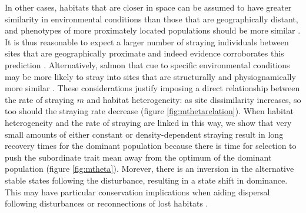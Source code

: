 \documentclass{revtex4}
\begin{document}
In other cases, habitats that are closer in space can be assumed to have greater similarity in environmental conditions than those that are geographically distant, and phenotypes of more proximately located populations should be more similar \citep{Reisenbichler:1988ex,Fraser:2011co,Westley:2012ui}.
It is thus reasonable to expect a larger number of straying individuals between sites that are geographically proximate and indeed evidence corroborates this prediction \citep{Candy:2000hu,JPE:JPE1383}.
Alternatively, salmon that cue to specific environmental conditions may be more likely to stray into sites that are structurally and physiognamically more similar \citep{Peterson:2014gy}.
These considerations justify imposing a direct relationship between the rate of straying $m$ and habitat heterogeneity: as site dissimilarity increases, so too should the straying rate decrease (figure \ref{fig:mthetarelation}).
When habitat heterogeneity and the rate of straying are linked in this way, we show that very small amounts of either constant or density-dependent straying result in long recovery times for the dominant population because there is time for selection to push the subordinate trait mean away from the optimum of the dominant population (figure \ref{fig:mtheta}). %
Morever, there is an inversion in the alternative stable states following the disturbance, resulting in a state shift in dominance.
This may have particular conservation implications when aiding dispersal following disturbances or reconnections of lost habitats \citep{Anderson:2013bf,Pess:2014isa}.
\end{document}
